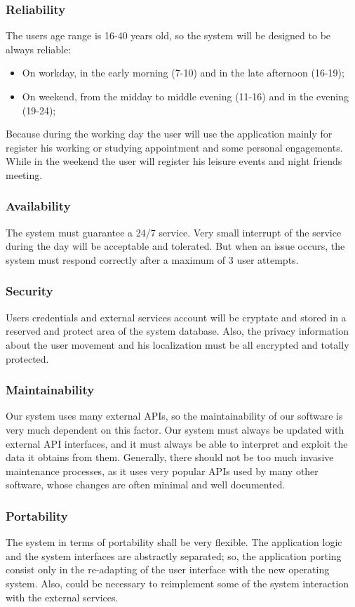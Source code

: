 \documentclass [12pt]{article}
\begin{document}
\subsubsection{Reliability}
The users age range is 16-40 years old, so the system will be designed to be always reliable:
\begin{itemize}
\item On workday, in the early morning (7-10) and in the late afternoon (16-19); 
\item On weekend, from the midday to middle evening (11-16) and in the evening (19-24);
\end{itemize}
Because during the working day the user will use the application mainly for register his working or studying appointment and some personal engagements.\\
While in the weekend the user will register his leisure events and night friends meeting.

\subsubsection{Availability}
The system must guarantee a 24/7 service. Very small interrupt of the service during the day will be acceptable and tolerated. But when an issue occurs, the system must respond correctly after a maximum of 3 user attempts.
\subsubsection{Security}
Users credentials and external services account will be cryptate and stored in a reserved and protect area of the system database. Also, the privacy information about the user movement and his localization must be all encrypted and totally protected.
\subsubsection{Maintainability}
Our system uses many external APIs, so the maintainability of our software is very much dependent on this factor. Our system must always be updated with external API interfaces, and it must always be able to interpret and exploit the data it obtains from them.
Generally, there should not be too much invasive maintenance processes, as it uses very popular APIs used by many other software, whose changes are often minimal and well documented.
\subsubsection{Portability}
The system in terms of portability shall be very flexible. The application logic and the system interfaces are abstractly separated; so, the application porting consist only in the re-adapting of the user interface with the new operating system.
Also, could be necessary to reimplement some of the system interaction with the external services.\\
\end{document}
